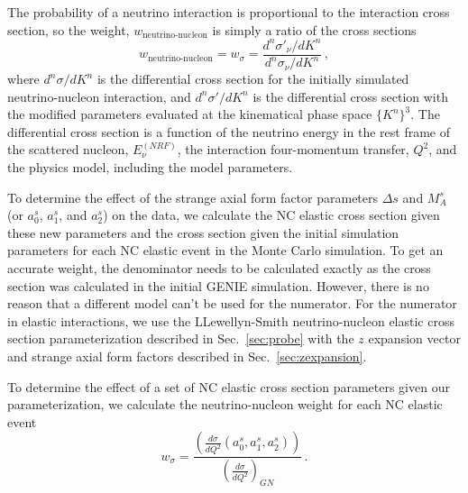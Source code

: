     The probability of a neutrino interaction is proportional to the
    interaction cross section, so the weight, $w_{\textrm{neutrino-nucleon}}$
    is simply a ratio of the cross sections
    \begin{equation}
      w_{\textrm{neutrino-nucleon}} = w_{\sigma} 
        = \frac{d^n\sigma'_{\nu}/dK^n}{d^n\sigma_{\nu}/dK^n} \,,
    \end{equation}
    where $d^n\sigma/dK^n$ is the differential cross section for the initially
    simulated neutrino-nucleon interaction, and $d^n\sigma'/dK^n$ is the
    differential cross section with the modified parameters evaluated at the
    kinematical phase space $\{K^n\}^3$. The differential cross section is a
    function of the neutrino energy in the rest frame of the scattered nucleon,
    $E_{\nu}^{(NRF)}$, the interaction four-momentum transfer, $Q^2$, and the
    physics model, including the model parameters.

    To determine the effect of the strange axial form factor parameters $\Delta
    s$ and $M_A^s$ (or $a_0^s$, $a_1^s$, and $a_2^s$) on the data, we calculate
    the NC elastic cross section given these new parameters and the cross
    section given the initial simulation parameters for each NC elastic event
    in the Monte Carlo simulation. To get an accurate weight, the denominator
    needs to be calculated exactly as the cross section was calculated in the
    initial GENIE simulation. However, there is no reason that a different
    model can't be used for the numerator. For the numerator in elastic
    interactions, we use the LLewellyn-Smith neutrino-nucleon elastic cross
    section parameterization described in Sec.~\ref{sec:probe} with the $z$
    expansion vector and strange axial form factors described in
    Sec.~\ref{sec:zexpansion}.

    To determine the effect of a set of NC elastic cross section parameters
    given our parameterization, we calculate the neutrino-nucleon weight for
    each NC elastic event
    \begin{equation}\label{eq:xsecweight}
      w_\sigma = \frac{\left(\frac{d\sigma}{dQ^2}(a_0^s,a_1^s,a_2^s)\right)}
                      {\left(\frac{d\sigma}{dQ^2}\right)_{GN}} \,.
    \end{equation}

